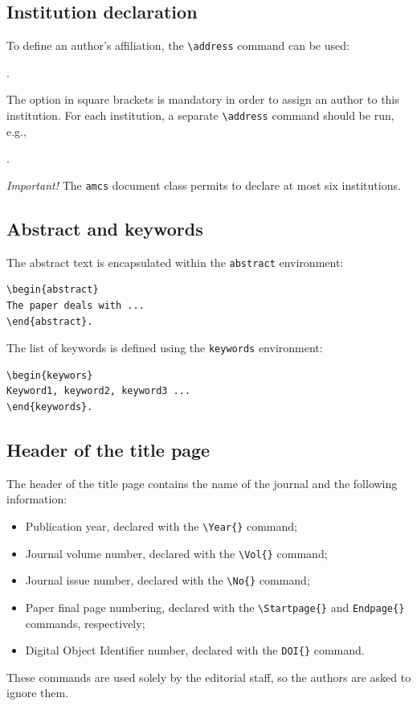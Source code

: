 \documentclass{amcs}
\begin{document}
\subsection{Institution declaration}
To define an author's affiliation, the \verb+\address+ command can be used:

\medskip
{}.

\medskip\noindent
The option in square brackets is mandatory in order to assign an author to this institution. For each institution, a separate \verb+\address+ command should be run, e.g.,

\medskip
{}
.

\medskip\noindent
\emph{Important!} The \verb+amcs+ document class permits to declare at most six institutions.

\subsection{Abstract and keywords}
The abstract text is encapsulated within the \verb+abstract+ environment:

{\small \begin{verbatim}
\begin{abstract}
The paper deals with ...
\end{abstract}.
\end{verbatim}}

\noindent The list of keywords is defined using the \verb+keywords+ environment:

{\small \begin{verbatim}
\begin{keywors}
Keyword1, keyword2, keyword3 ...
\end{keywords}.
\end{verbatim}}

\subsection{Header of the title page}
The header of the title page contains the name of the journal and the following information:
\begin{itemize}
  \item
    Publication year, declared with the \verb+\Year{}+ command;
  \item
    Journal volume number, declared with the \verb+\Vol{}+ command;
  \item
    Journal issue number, declared with the \verb+\No{}+ command;
  \item
    Paper final page numbering, declared with the \verb+\Startpage{}+ and \verb+Endpage{}+ commands, respectively;
  \item
    Digital Object Identifier number, declared with the \verb+DOI{}+ command.
\end{itemize}
These commands are used solely by the editorial staff, so the authors are asked to ignore them.
\end{document}
